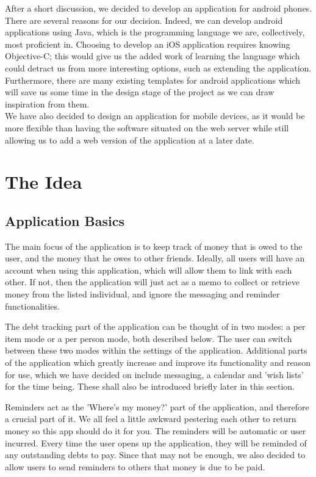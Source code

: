 \documentclass[a4paper,9t]{article}
\begin{document}
After a short discussion, we decided to develop an application for android phones. There are several reasons for our decision. Indeed, we can develop android applications using Java, which is the programming language we are, collectively, most proficient in. Choosing to develop an iOS application requires knowing Objective-C; this would give us the added work of learning the language which could detract us from more interesting options, such as extending the application. Furthermore, there are many existing templates for android applications which will save us some time in the design stage of the project as we can draw inspiration from them. \\
We have also decided to design an application for mobile devices, as it would be more flexible than having the software situated on the web server while still allowing us to add a web version of the application at a later date.

\section*{The Idea}

\subsection*{Application Basics}
The main focus of the application is to keep track of money that is owed to the user, and the money that he owes to other friends. Ideally, all users will have an account when using this application, which will allow them to link with each other. If not, then the application will just act as a memo to collect or retrieve money from the listed individual, and ignore the messaging and reminder functionalities. 

The debt tracking part of the application can be thought of in two modes: a per item mode or a per person mode, both described below. The user can switch between these two modes within the settings of the application.  
Additional parts of the application which greatly increase and improve its functionality and reason for use, which we have decided on include messaging, a calendar and 'wish lists' for the time being. These shall also be introduced briefly later in this section.

Reminders act as the 'Where's my money?' part of the application, and therefore a crucial part of it. We all feel a little awkward pestering each other to return money so this app should do it for you.
The reminders will be automatic or user incurred. Every time the user opens up the application, they will be reminded of any outstanding debts to pay. Since that may not be enough, we also decided to allow users to send reminders to others that money is due to be paid. 
\end{document}
